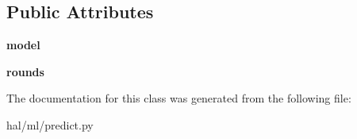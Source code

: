 \subsection*{Public Attributes}
\begin{DoxyCompactItemize}
\item 
{\bfseries model}\hypertarget{classhal_1_1ml_1_1predict_1_1_base_prediction_a78a5950426761d76607463957e6d7b5f}{}\label{classhal_1_1ml_1_1predict_1_1_base_prediction_a78a5950426761d76607463957e6d7b5f}

\item 
{\bfseries rounds}\hypertarget{classhal_1_1ml_1_1predict_1_1_base_prediction_a706bdbfbad676c63b8755e43189d706f}{}\label{classhal_1_1ml_1_1predict_1_1_base_prediction_a706bdbfbad676c63b8755e43189d706f}

\end{DoxyCompactItemize}


The documentation for this class was generated from the following file\+:\begin{DoxyCompactItemize}
\item 
hal/ml/predict.\+py\end{DoxyCompactItemize}
